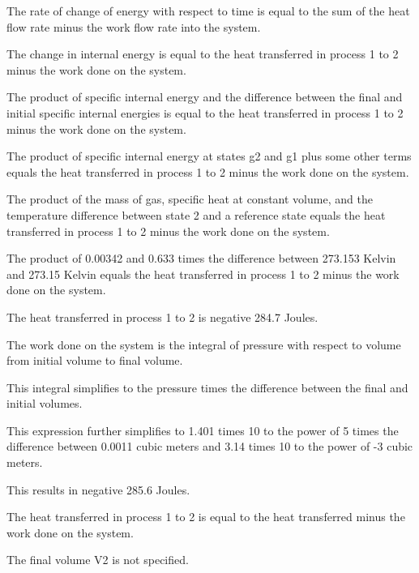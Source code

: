 The rate of change of energy with respect to time is equal to the sum of the heat flow rate minus the work flow rate into the system.

The change in internal energy is equal to the heat transferred in process 1 to 2 minus the work done on the system.

The product of specific internal energy and the difference between the final and initial specific internal energies is equal to the heat transferred in process 1 to 2 minus the work done on the system.

The product of specific internal energy at states g2 and g1 plus some other terms equals the heat transferred in process 1 to 2 minus the work done on the system.

The product of the mass of gas, specific heat at constant volume, and the temperature difference between state 2 and a reference state equals the heat transferred in process 1 to 2 minus the work done on the system.

The product of 0.00342 and 0.633 times the difference between 273.153 Kelvin and 273.15 Kelvin equals the heat transferred in process 1 to 2 minus the work done on the system.

The heat transferred in process 1 to 2 is negative 284.7 Joules.

The work done on the system is the integral of pressure with respect to volume from initial volume to final volume.

This integral simplifies to the pressure times the difference between the final and initial volumes.

This expression further simplifies to 1.401 times 10 to the power of 5 times the difference between 0.0011 cubic meters and 3.14 times 10 to the power of -3 cubic meters.

This results in negative 285.6 Joules.

The heat transferred in process 1 to 2 is equal to the heat transferred minus the work done on the system.

The final volume V2 is not specified.